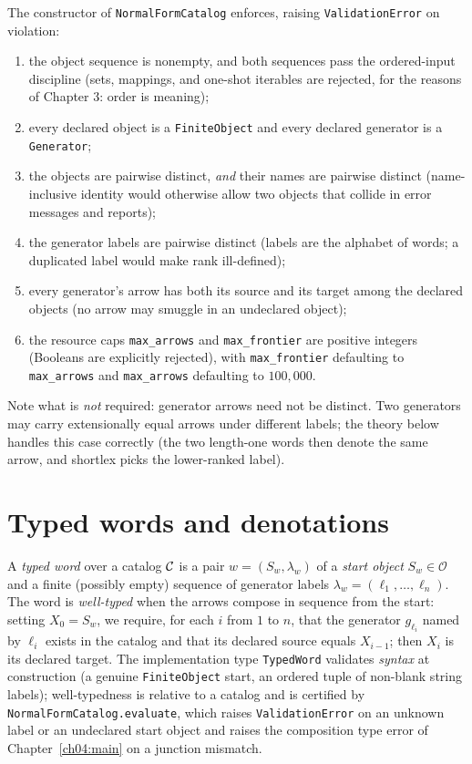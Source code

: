 \begin{invariant}\label{ch08:inv:catalog}
The constructor of \texttt{NormalFormCatalog} enforces, raising
\texttt{ValidationError} on violation:
\begin{enumerate}
\item the object sequence is nonempty, and both sequences pass the
  ordered-input discipline (sets, mappings, and one-shot iterables are
  rejected, for the reasons of Chapter 3: order is meaning);
\item every declared object is a \texttt{FiniteObject} and every declared
  generator is a \texttt{Generator};
\item the objects are pairwise distinct, \emph{and} their names are pairwise
  distinct (name-inclusive identity would otherwise allow two objects that
  collide in error messages and reports);
\item the generator labels are pairwise distinct (labels are the alphabet of
  words; a duplicated label would make rank ill-defined);
\item every generator's arrow has both its source and its target among the
  declared objects (no arrow may smuggle in an undeclared object);
\item the resource caps \texttt{max\_arrows} and \texttt{max\_frontier} are
  positive integers (Booleans are explicitly rejected), with
  \texttt{max\_frontier} defaulting to \texttt{max\_arrows} and
  \texttt{max\_arrows} defaulting to $100{,}000$.
\end{enumerate}
Note what is \emph{not} required: generator arrows need not be distinct.
Two generators may carry extensionally equal arrows under different labels;
the theory below handles this case correctly (the two length-one words then
denote the same arrow, and shortlex picks the lower-ranked label).
\end{invariant}

\section{Typed words and denotations}\label{ch08:sec:words}

\begin{definition}\label{ch08:def:word}
A \emph{typed word} over a catalog $\mathcal{C}$ is a pair $w=(S_w, \lambda_w)$ of a
\emph{start object} $S_w\in\mathcal{O}$ and a finite (possibly empty)
sequence of generator labels $\lambda_w=(\ell_1,\dots,\ell_n)$. The word is
\emph{well-typed} when the arrows compose in sequence from the start:
setting $X_0=S_w$, we require, for each $i$ from $1$ to $n$, that the
generator $g_{\ell_i}$ named by $\ell_i$ exists in the catalog and that its
declared source equals $X_{i-1}$; then $X_i$ is its declared target. The
implementation type \texttt{TypedWord} validates \emph{syntax} at
construction (a genuine \texttt{FiniteObject} start, an ordered tuple of
non-blank string labels); well-typedness is relative to a catalog and is
certified by \texttt{NormalFormCatalog.evaluate}, which raises
\texttt{ValidationError} on an unknown label or an undeclared start object
and raises the composition type error of Chapter~\ref{ch04:main} on a
junction mismatch.
\end{definition}

